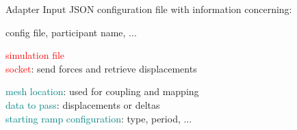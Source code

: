 \documentclass[10pt,t]{beamer}
\begin{document}
\begin{frame}{Adapter Input}
  \vspace{5mm}
  JSON configuration file with information concerning:
  \vspace{5mm}
  \begin{description}[Simulation]
  \itemsep 10pt
  \item[preCICE] \textcolor{dorange}{config file, participant name, ...}
  \item[MBDyn]      \textcolor{red}{simulation file} \\
                    \textcolor{red}{socket}: send forces and retrieve displacements \\
  \item[Simulation] \textcolor{teal}{mesh location}: used for coupling and mapping\\
                    \textcolor{teal}{data to pass}: displacements or deltas\\
                    \textcolor{teal}{starting ramp configuration}: type, period, ...
  \end{description}


\end{frame}
\end{document}
